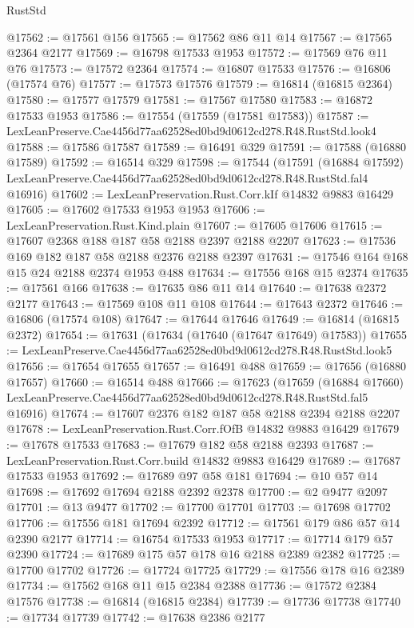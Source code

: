 \begin{lexlean}{RustStd}
\begin{coremodule}
@17562 := @17561 @156
@17565 := @17562 @86 @11 @14
@17567 := @17565 @2364 @2177
@17569 := @16798 @17533 @1953
@17572 := @17569 @76 @11 @76
@17573 := @17572 @2364
@17574 := @16807 @17533
@17576 := @16806 (@17574 @76)
@17577 := @17573 @17576
@17579 := @16814 (@16815 @2364)
@17580 := @17577 @17579
@17581 := @17567 @17580
@17583 := @16872 @17533 @1953
@17586 := @17554 (@17559 (@17581 @17583))
@17587 := LexLeanPreserve.Cae4456d77aa62528ed0bd9d0612cd278.R48.RustStd.look4
@17588 := @17586 @17587
@17589 := @16491 @329
@17591 := @17588 (@16880 @17589)
@17592 := @16514 @329
@17598 := @17544
    (@17591
      (@16884 @17592)
      LexLeanPreserve.Cae4456d77aa62528ed0bd9d0612cd278.R48.RustStd.fal4
      @16916)
@17602 := LexLeanPreservation.Rust.Corr.kIf @14832 @9883 @16429
@17605 := @17602 @17533 @1953 @1953
@17606 := LexLeanPreservation.Rust.Kind.plain
@17607 := @17605 @17606
@17615 := @17607 @2368 @188 @187 @58 @2188 @2397 @2188 @2207
@17623 := @17536 @169 @182 @187 @58 @2188 @2376 @2188 @2397
@17631 := @17546 @164 @168 @15 @24 @2188 @2374 @1953 @488
@17634 := @17556 @168 @15 @2374
@17635 := @17561 @166
@17638 := @17635 @86 @11 @14
@17640 := @17638 @2372 @2177
@17643 := @17569 @108 @11 @108
@17644 := @17643 @2372
@17646 := @16806 (@17574 @108)
@17647 := @17644 @17646
@17649 := @16814 (@16815 @2372)
@17654 := @17631 (@17634 (@17640 (@17647 @17649) @17583))
@17655 := LexLeanPreserve.Cae4456d77aa62528ed0bd9d0612cd278.R48.RustStd.look5
@17656 := @17654 @17655
@17657 := @16491 @488
@17659 := @17656 (@16880 @17657)
@17660 := @16514 @488
@17666 := @17623
    (@17659
      (@16884 @17660)
      LexLeanPreserve.Cae4456d77aa62528ed0bd9d0612cd278.R48.RustStd.fal5
      @16916)
@17674 := @17607 @2376 @182 @187 @58 @2188 @2394 @2188 @2207
@17678 := LexLeanPreservation.Rust.Corr.fOfB @14832 @9883 @16429
@17679 := @17678 @17533
@17683 := @17679 @182 @58 @2188 @2393
@17687 := LexLeanPreservation.Rust.Corr.build @14832 @9883 @16429
@17689 := @17687 @17533 @1953
@17692 := @17689 @97 @58 @181
@17694 := @10 @57 @14
@17698 := @17692 @17694 @2188 @2392 @2378
@17700 := @2 @9477 @2097
@17701 := @13 @9477
@17702 := @17700 @17701
@17703 := @17698 @17702
@17706 := @17556 @181 @17694 @2392
@17712 := @17561 @179 @86 @57 @14 @2390 @2177
@17714 := @16754 @17533 @1953
@17717 := @17714 @179 @57 @2390
@17724 := @17689 @175 @57 @178 @16 @2188 @2389 @2382
@17725 := @17700 @17702
@17726 := @17724 @17725
@17729 := @17556 @178 @16 @2389
@17734 := @17562 @168 @11 @15 @2384 @2388
@17736 := @17572 @2384 @17576
@17738 := @16814 (@16815 @2384)
@17739 := @17736 @17738
@17740 := @17734 @17739
@17742 := @17638 @2386 @2177

\end{coremodule}
\end{lexlean}
